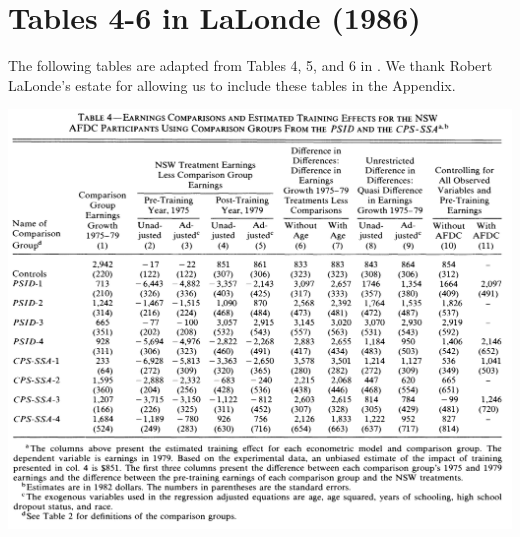 \documentclass[letterpaper,12pt,leqno]{article}
\newcommand{\bib}{main.bib}
\begin{document}
\vspace{3em}
\clearpage


\clearpage
\appendix
\onehalfspacing
\setcounter{page}{1}
\setcounter{table}{0}
\setcounter{figure}{0}
\setcounter{equation}{0}
\setcounter{footnote}{0}
\renewcommand\thetable{A\arabic{table}}
\renewcommand\thefigure{A\arabic{figure}}
\renewcommand{\thepage}{A-\arabic{page}}
\renewcommand{\theequation}{A\arabic{equation}}
\renewcommand{\thefootnote}{A\arabic{footnote}}

\vspace{0em}
\section{Tables 4-6 in LaLonde (1986)}
\bigskip

The following tables are adapted from Tables 4, 5, and 6 in \citet{LaLonde}. We thank Robert LaLonde's estate for allowing us to include these tables in the Appendix.

\begin{table}[!ht]
\includegraphics[scale = 0.4]{LaLonde_table4.png}
\end{table}
\clearpage
\end{document}
